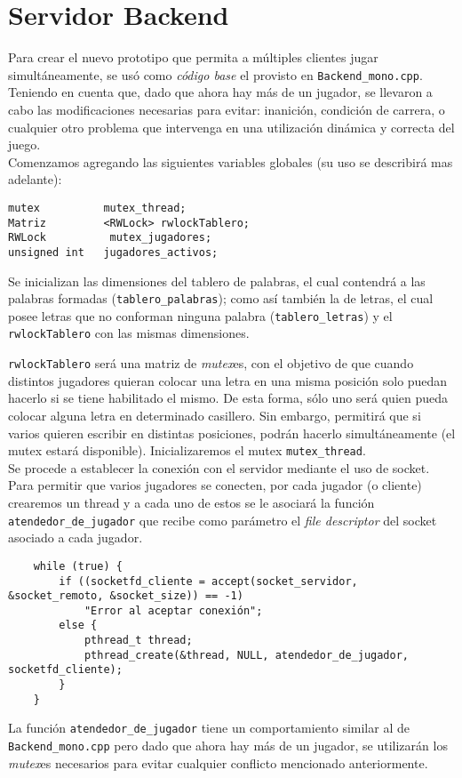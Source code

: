\section{Servidor Backend}
Para crear el nuevo prototipo que permita a múltiples clientes jugar simultáneamente, se us\'o como  \textit{código base} el provisto en \texttt{Backend\_mono.cpp}. Teniendo en cuenta que, dado que ahora hay m\'as de un jugador, se llevaron a cabo las modificaciones necesarias para evitar: inanición, condición de carrera, o cualquier otro problema que intervenga en una utilización dinámica y correcta del juego.\\

Comenzamos agregando las siguientes variables globales (su uso se describirá mas adelante):
\begin{verbatim}
mutex          mutex_thread;
Matriz         <RWLock> rwlockTablero;
RWLock          mutex_jugadores;
unsigned int   jugadores_activos;
\end{verbatim}

Se inicializan las dimensiones del tablero de palabras, el cual contendr\'a a las palabras formadas (\texttt{tablero\_palabras}); como así tambi\'en la de letras, el cual posee letras que no conforman ninguna palabra (\texttt{tablero\_letras}) y el \texttt{rwlockTablero} con las mismas dimensiones.

 \texttt{rwlockTablero} ser\'a una matriz de \emph{mutex}es, con el objetivo de que cuando distintos jugadores quieran  colocar una letra en una misma posición solo puedan hacerlo si se tiene habilitado el mismo. De esta forma, s\'olo uno ser\'a quien pueda colocar alguna letra en determinado casillero. Sin embargo, permitir\'a que si varios quieren escribir en distintas posiciones, podrán hacerlo simultáneamente (el mutex estar\'a disponible). Inicializaremos el mutex \texttt{mutex\_thread}.\\

Se procede a establecer la conexión con el servidor mediante el uso de socket. Para permitir que varios jugadores se conecten, por cada jugador (o cliente) crearemos un thread y a cada uno de estos se le asociar\'a la función \texttt{atendedor\_de\_jugador} que recibe como parámetro el \textit{file descriptor} del socket asociado a cada jugador. 

\begin{verbatim}
    while (true) {
        if ((socketfd_cliente = accept(socket_servidor, &socket_remoto, &socket_size)) == -1)
            "Error al aceptar conexión";
        else {
            pthread_t thread;
            pthread_create(&thread, NULL, atendedor_de_jugador, socketfd_cliente);
        }
    }
\end{verbatim}
La funci\'on \texttt{atendedor\_de\_jugador} tiene un comportamiento similar al de \texttt{Backend\_mono.cpp} pero dado que ahora hay m\'as de un jugador, se utilizar\'an los \emph{mutex}es necesarios para evitar cualquier conflicto mencionado anteriormente.\\

